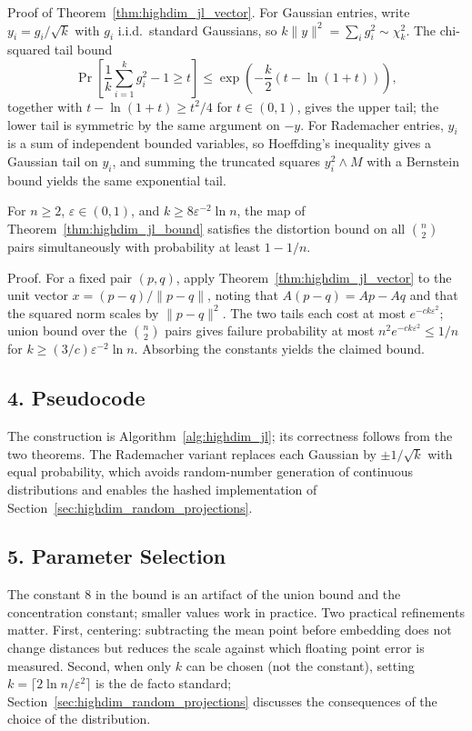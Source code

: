 Proof of Theorem~\ref{thm:highdim_jl_vector}. For Gaussian entries, write
$y_i = g_i/\sqrt{k}$ with $g_i$ i.i.d.\ standard Gaussians, so
$k \|y\|^2 = \sum_i g_i^2 \sim \chi^2_k$. The chi-squared tail bound
\[
\Pr\left[ \frac{1}{k}\sum_{i=1}^{k} g_i^2 - 1 \ge t \right]
\le \exp\left( - \frac{k}{2}(t - \ln(1+t)) \right),
\]
together with $t - \ln(1+t) \ge t^2/4$ for $t \in (0,1)$, gives the upper
tail; the lower tail is symmetric by the same argument on $-y$. For Rademacher
entries, $y_i$ is a sum of independent bounded variables, so
 Hoeffding's inequality gives a Gaussian tail on $y_i$, and summing the
 truncated squares $y_i^2 \wedge M$ with a Bernstein bound yields the same
 exponential tail.


\begin{theorem}
\label{thm:highdim_jl_proved}
For $n \ge 2$, $\varepsilon \in (0,1)$, and
$k \ge 8 \varepsilon^{-2} \ln n$, the map of
Theorem~\ref{thm:highdim_jl_bound} satisfies the distortion bound on all
$\binom{n}{2}$ pairs simultaneously with probability at least $1 - 1/n$.
\end{theorem}

Proof. For a fixed pair $(p, q)$, apply Theorem~\ref{thm:highdim_jl_vector} to
the unit vector $x = (p - q)/\|p - q\|$, noting that
$A(p - q) = A p - A q$ and that the squared norm scales by
$\|p - q\|^2$. The two tails each cost at most $e^{-c k \varepsilon^2}$;
union bound over the $\binom{n}{2}$ pairs gives failure probability at most
$n^2 e^{-c k \varepsilon^2} \le 1/n$ for
$k \ge (3/c) \varepsilon^{-2} \ln n$. Absorbing the constants yields the
claimed bound.

\subsection{4. Pseudocode}

The construction is Algorithm~\ref{alg:highdim_jl}; its correctness follows
from the two theorems. The Rademacher variant replaces each Gaussian by
$\pm 1/\sqrt{k}$ with equal probability, which avoids random-number generation
of continuous distributions and enables the hashed implementation of
Section~\ref{sec:highdim_random_projections}.

\subsection{5. Parameter Selection}

The constant $8$ in the bound is an artifact of the union bound and the
concentration constant; smaller values work in practice. Two practical
refinements matter. First, centering: subtracting the mean point before
embedding does not change distances but reduces the scale against which
floating point error is measured. Second, when only $k$ can be chosen
(not the constant), setting $k = \lceil 2 \ln n / \varepsilon^2 \rceil$ is the
de facto standard; Section~\ref{sec:highdim_random_projections} discusses the
consequences of the choice of the distribution.

